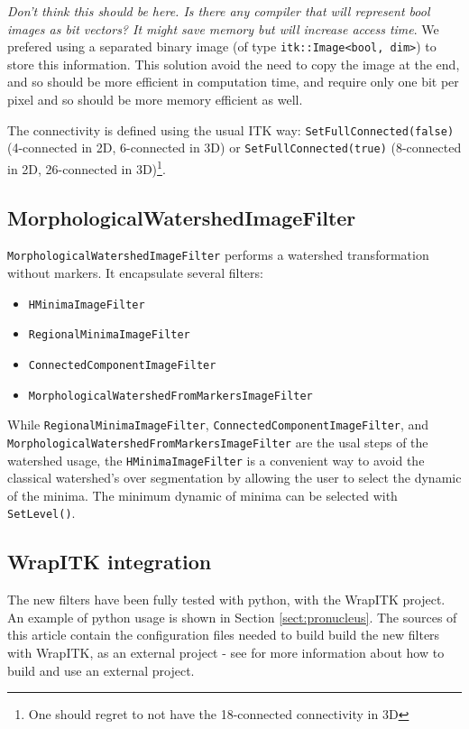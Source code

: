 \documentclass{InsightArticle}
\begin{document}
{\em Don't think this should be here. Is there any compiler that will
represent bool images as bit vectors? It might save memory but will
increase access time}.  We prefered using a separated binary image (of
type \verb$itk::Image<bool, dim>$) to store this information. This
solution avoid the need to copy the image at the end, and so should be
more efficient in computation time, and require only one bit per pixel
and so should be more memory efficient as well.

The connectivity is defined using the usual ITK way: \verb$SetFullConnected(false)$
(4-connected in 2D, 6-connected in 3D) or \verb$SetFullConnected(true)$ (8-connected
in 2D, 26-connected in 3D)\footnote{One should regret to not have the 18-connected
connectivity in 3D}.

  \subsection{MorphologicalWatershedImageFilter}

\verb$MorphologicalWatershedImageFilter$ performs a watershed transformation
without markers. It encapsulate several filters:
\begin{itemize}
  \item \verb$HMinimaImageFilter$
  \item \verb$RegionalMinimaImageFilter$
  \item \verb$ConnectedComponentImageFilter$
  \item \verb$MorphologicalWatershedFromMarkersImageFilter$
\end{itemize}
While \verb$RegionalMinimaImageFilter$, \verb$ConnectedComponentImageFilter$,
and \verb$MorphologicalWatershedFromMarkersImageFilter$ are the usal steps
of the watershed usage, the \verb$HMinimaImageFilter$ is a convenient way
to avoid the classical watershed's over segmentation by allowing the user
to select the dynamic of the minima. The minimum dynamic of minima can be
selected with \verb$SetLevel()$.

  \subsection{WrapITK integration}

The new filters have been fully tested with python, with the WrapITK project.
An example of python usage is shown in Section \ref{sect:pronucleus}.
The sources of this article contain the configuration files needed to build
build the new filters with WrapITK, as an external project - see \cite{WrapITK}
for more information about how to build and use an external project.
\end{document}
